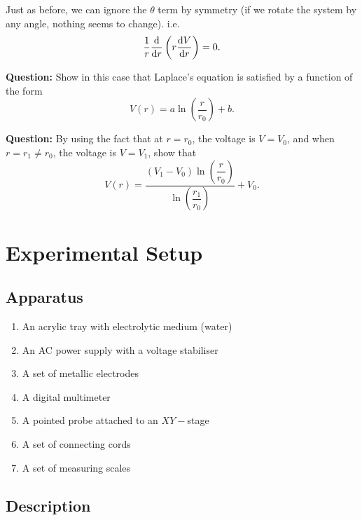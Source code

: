 Just as before, we can ignore the $\theta$ term by symmetry (if we rotate the system by any angle, nothing seems to change). i.e.\ 
\begin{equation}
    \frac{1}{r}\dv{}{r}\left(r \dv{V}{r}\right) =0.
\end{equation}

\begin{question}
\textbf{Question:} Show in this case that Laplace's equation is satisfied by a function of the form
\begin{equation}
V(r) = a \ln\left(\frac{r}{r_0}\right) + b.
\end{equation}

\textbf{Question:} By using the fact that at $r = r_0$, the voltage is $V = V_0$, and when $r = r_1  \neq r_0$, the voltage is $V = V_1$, show that
\begin{equation}
    V(r) = \dfrac{(V_1 - V_0) \ln{\left(\dfrac{r}{r_0}\right)}}{\ln{\left(\dfrac{r_1}{r_0}\right)}}  + V_0.
    \label{eqn:concentric-cylinder-field}
\end{equation}

\end{question}

\section*{Experimental Setup}

\subsection*{Apparatus}

\begin{enumerate}[label=\arabic*)]
\itemsep0em
\item An acrylic tray with electrolytic medium (water)
\item An AC power supply with a voltage stabiliser 
\item A set of metallic electrodes
\item A digital multimeter
\item A pointed probe attached to an $XY-$stage
\item A set of connecting cords
\item A set of measuring scales
\end{enumerate}

 \subsection*{Description}

